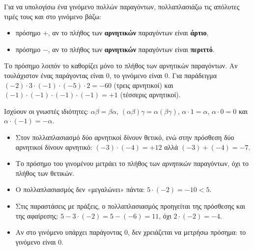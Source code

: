 \begin{center}
\end{center}


Για να υπολογίσω ένα γινόμενο πολλών παραγόντων, πολλαπλασιάζω τις απόλυτες τιμές τους και στο γινόμενο βάζω:
\begin{itemize}[leftmargin=1.2em,itemsep=0.3ex,topsep=2pt]
\item πρόσημο $+$, αν το πλήθος των \textbf{αρνητικών} παραγόντων είναι \textbf{άρτιο},
\item πρόσημο $-$, αν το πλήθος των \textbf{αρνητικών} παραγόντων είναι \textbf{περιττό}.
\end{itemize}
Το πρόσημο λοιπόν το καθορίζει μόνο το πλήθος των αρνητικών παραγόντων. Αν τουλάχιστον ένας παράγοντας είναι $0$, το γινόμενο είναι $0$. Για παράδειγμα $(-2)\cdot3\cdot(-1)\cdot(-5)\cdot2=-60$ (τρεις αρνητικοί) και $(-1)\cdot(-1)\cdot(-1)\cdot(-1)=+1$ (τέσσερις αρνητικοί).

Ισχύουν οι γνωστές ιδιότητες: $\alpha\beta=\beta\alpha$, $(\alpha\beta)\gamma=\alpha(\beta\gamma)$, $\alpha\cdot1=\alpha$, $\alpha\cdot0=0$ και $\alpha\cdot(-1)=-\alpha$.

\begin{prosoxi}
\begin{itemize}[leftmargin=1.2em,itemsep=0.3ex,topsep=2pt]
\item Στον πολλαπλασιασμό δύο αρνητικοί δίνουν θετικό, ενώ στην πρόσθεση δύο αρνητικοί δίνουν αρνητικό: $(-3)\cdot(-4)=+12$ αλλά $(-3)+(-4)=-7$.
\item Το πρόσημο του γινομένου μετράει το πλήθος των \emph{αρνητικών} παραγόντων, όχι το πλήθος των θετικών.
\item Ο πολλαπλασιασμός δεν «μεγαλώνει» πάντα: $5\cdot(-2)=-10<5$.
\item Στις παραστάσεις με πράξεις, ο πολλαπλασιασμός προηγείται της πρόσθεσης και της αφαίρεσης: $5-3\cdot(-2)=5-(-6)=11$, όχι $2\cdot(-2)=-4$.
\item Αν στο γινόμενο υπάρχει παράγοντας $0$, δεν χρειάζεται να μετρήσω πρόσημα: το γινόμενο είναι $0$.
\end{itemize}
\end{prosoxi}

